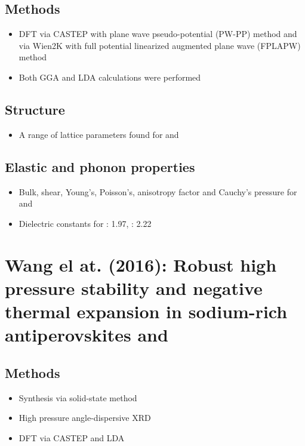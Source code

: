 \documentclass[10pt,a4paper, titlepage]{article}
\begin{document}
\subsection{Methods}

\begin{itemize}
  \item DFT via CASTEP with plane wave pseudo-potential (PW-PP) method and via Wien2K with full potential linearized augmented plane wave (FPLAPW) method
  \item Both GGA and LDA calculations were performed
\end{itemize}

\subsection{Structure}

\begin{itemize}
  \item A range of lattice parameters found for  and 
\end{itemize}

\subsection{Elastic and phonon properties}

\begin{itemize}
  \item Bulk, shear, Young's, Poisson's, anisotropy factor and Cauchy's pressure for  and 
  \item Dielectric constants for : 1.97, : 2.22
\end{itemize}

\section{Wang el at. (2016): Robust high pressure stability and negative thermal expansion in sodium-rich antiperovskites  and }

\subsection{Methods}

\begin{itemize}
  \item Synthesis via solid-state method
  \item High pressure angle-dispersive XRD
  \item DFT via CASTEP and LDA
\end{itemize}
\end{document}

